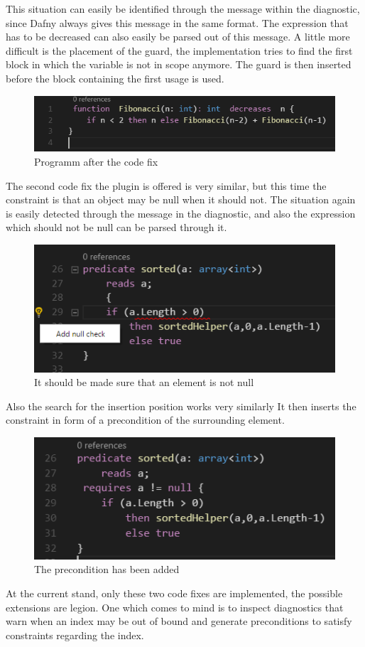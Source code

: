 This situation can easily be identified through the message within the diagnostic, since Dafny always gives this message in the same format. The expression that has to be decreased can also easily be parsed out of this message. A little more difficult is the placement of the guard, the implementation tries to find the first block in which the variable is not in scope anymore. The guard is then inserted before the block containing the first usage is used. \newline
  \begin{figure}[H]
	\centering
	\includegraphics[width=1\textwidth]{img/decreaseGuardApplied}
	\caption{Programm after the code fix}
	\label{fig:decreaseguardapplied}
\end{figure}
The second code fix the plugin is offered is very similar, but this time the constraint is that an object may be null when it should not. The situation again is easily detected through the message in the diagnostic, and also the expression which should not be null can be parsed through it.
  \begin{figure}[H]
	\centering
	\includegraphics[width=1\textwidth]{img/nullCheck}
	\caption{It should be made sure that an element is not null}
	\label{fig:nullcheck}
\end{figure}
Also the search for the insertion position works very similarly It then inserts the constraint in form of a precondition of the surrounding element. \newline
  \begin{figure}[H]
	\centering
	\includegraphics[width=1\textwidth]{img/nullCheckApplied}
	\caption{The precondition has been added}
	\label{fig:nullcheckapplied}
\end{figure}
At the current stand, only these two code fixes are implemented, the possible extensions are legion. One which comes to mind is to inspect diagnostics that warn when an index may be out of bound and generate preconditions to satisfy constraints regarding the index. \newline
